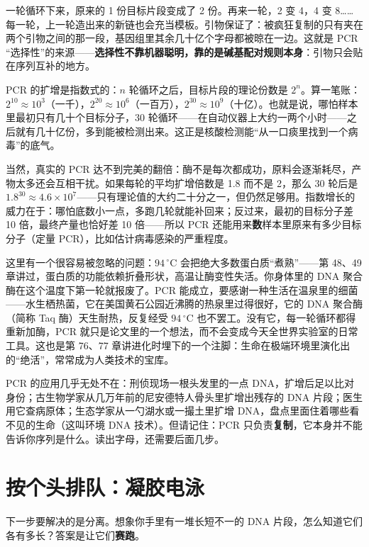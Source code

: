 一轮循环下来，原来的 1 份目标片段变成了 2 份。再来一轮，2 变 4，4 变 8……每一轮，上一轮造出来的新链也会充当模板。引物保证了：被疯狂复制的只有夹在两个引物之间的那一段，基因组里其余几十亿个字母都被晾在一边。这就是 PCR “选择性”的来源——\textbf{选择性不靠机器聪明，靠的是碱基配对规则本身}：引物只会贴在序列互补的地方。

\begin{qiaoliang}
PCR 的扩增是指数式的：$n$ 轮循环之后，目标片段的理论份数是 $2^n$。算一笔账：$2^{10}\approx 10^3$（一千），$2^{20}\approx 10^{6}$（一百万），$2^{30}\approx 10^{9}$（十亿）。也就是说，哪怕样本里最初只有几十个目标分子，30 轮循环——在自动仪器上大约一两个小时——之后就有几十亿份，多到能被检测出来。这正是核酸检测能“从一口痰里找到一个病毒”的底气。

当然，真实的 PCR 达不到完美的翻倍：酶不是每次都成功，原料会逐渐耗尽，产物太多还会互相干扰。如果每轮的平均扩增倍数是 1.8 而不是 2，那么 30 轮后是 $1.8^{30}\approx 4.6\times 10^{7}$——只有理论值的大约二十分之一，但仍然足够用。指数增长的威力在于：哪怕底数小一点，多跑几轮就能补回来；反过来，最初的目标分子差 10 倍，最终产量也恰好差 10 倍——所以 PCR 还能用来\textbf{数}样本里原来有多少目标分子（定量 PCR），比如估计病毒感染的严重程度。
\end{qiaoliang}

这里有一个很容易被忽略的问题：$94\,^{\circ}\mathrm{C}$ 会把绝大多数蛋白质“煮熟”——第 48、49 章讲过，蛋白质的功能依赖折叠形状，高温让酶变性失活。你身体里的 DNA 聚合酶在这个温度下第一轮就报废了。PCR 能成立，要感谢一种生活在温泉里的细菌——水生栖热菌，它在美国黄石公园近沸腾的热泉里过得很好，它的 DNA 聚合酶（简称 Taq 酶）天生耐热，反复经受 $94\,^{\circ}\mathrm{C}$ 也不罢工。没有它，每一轮循环都得重新加酶，PCR 就只是论文里的一个想法，而不会变成今天全世界实验室的日常工具。这也是第 76、77 章讲进化时埋下的一个注脚：生命在极端环境里演化出的“绝活”，常常成为人类技术的宝库。

PCR 的应用几乎无处不在：刑侦现场一根头发里的一点 DNA，扩增后足以比对身份；古生物学家从几万年前的尼安德特人骨头里扩增出残存的 DNA 片段；医生用它查病原体；生态学家从一勺湖水或一撮土里扩增 DNA，盘点里面住着哪些看不见的生命（这叫环境 DNA 技术）。但请记住：PCR 只负责\textbf{复制}，它本身并不能告诉你序列是什么。读出字母，还需要后面几步。

\section{按个头排队：凝胶电泳}

下一步要解决的是分离。想象你手里有一堆长短不一的 DNA 片段，怎么知道它们各有多长？答案是让它们\textbf{赛跑}。

